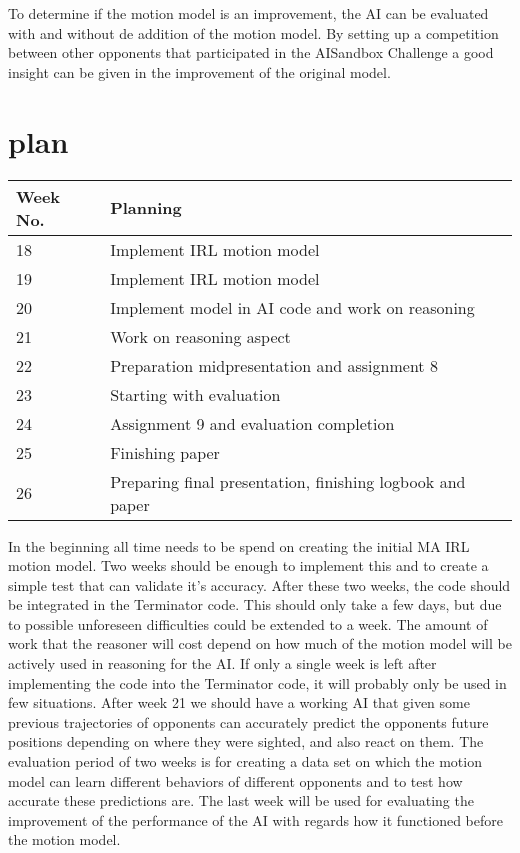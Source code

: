 \documentclass[a4paper, 12pt]{article}
\begin{document}
To determine if the motion model is an improvement, the AI can be evaluated with
and without de addition of the motion model. By setting up a competition between
other opponents that participated in the AISandbox Challenge a good insight can
be given in the improvement of the original model.
\section{plan}
\begin{table}
\centering
    \begin{tabular}{| l | l |}
      \hline                        
      Week No. & Planning \\
      \hline
      \hline
      18 &  Implement IRL motion model \\
      \hline
      19 &  Implement IRL motion model \\
      \hline
      20 &  Implement model in AI code and work on reasoning\\
      \hline
      21 &  Work on reasoning aspect \\
      \hline
      22 &  Preparation midpresentation and assignment 8\\
      \hline
      23 &  Starting with evaluation\\
      \hline
      24 &  Assignment 9 and evaluation completion \\
      \hline
      25 &  Finishing paper \\
      \hline
      26 &  Preparing final presentation, finishing logbook and paper \\
      \hline
    \end{tabular}
\end{table}
In the beginning all time needs to be spend on creating the initial MA IRL
motion model. Two weeks should be enough to implement this and to create a
simple test that can validate it's accuracy. After these two weeks, the code
should be integrated in the Terminator code. This should only take a few days,
but due to possible unforeseen difficulties could be extended to a week. The
amount of work that the reasoner will cost depend on how much of the motion
model will be actively used in reasoning for the AI. If only a single week is
left after implementing the code into the Terminator code, it will probably only
be used in few situations. After week 21 we should have a working AI that given
some previous trajectories of opponents can accurately predict the opponents
future positions depending on where they were sighted, and also react on them.
The evaluation period of two weeks is for creating a data set on which the
motion model can learn different behaviors of different opponents and to test
how accurate these predictions are. The last week will be used for evaluating
the improvement of the performance of the AI with regards how it functioned
before the motion model.




\end{document}
